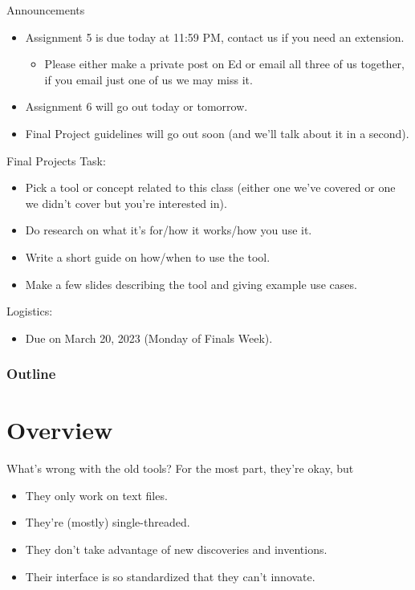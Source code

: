 \begin{frame}{Announcements}
  \begin{itemize}
    \item Assignment 5 is due today at 11:59 PM, contact us if you need an
      extension.
      \begin{itemize}
        \item Please either make a private post on Ed or email all three of us
          together, if you email just one of us we may miss it.
      \end{itemize}
    \item Assignment 6 will go out today or tomorrow.
    \item Final Project guidelines will go out soon (and we'll talk about it in
      a second).
  \end{itemize}
\end{frame}

\begin{frame}{Final Projects}
  Task:
  \begin{itemize}
    \item Pick a tool or concept related to this class (either one we've
      covered or one we didn't cover but you're interested in).
    \item Do research on what it's for/how it works/how you use it.
    \item Write a short guide on how/when to use the tool.
    \item Make a few slides describing the tool and giving example use cases.
  \end{itemize}
  Logistics:
  \begin{itemize}
    \item Due on March 20, 2023 (Monday of Finals Week).
  \end{itemize}
\end{frame}

\begin{frame}
  \frametitle{Outline}
  \tableofcontents[hidesubsections]
\end{frame}

\section{Overview}

\begin{frame}{What's wrong with the old tools?}
  For the most part, they're okay, but\textellipsis
  \pause
  \begin{itemize}
    \item They only work on text files.
      \pause
    \item They're (mostly) single-threaded.
      \pause
    \item They don't take advantage of new discoveries and inventions.
      \pause
    \item Their interface is so standardized that they can't innovate.
  \end{itemize}
\end{frame}

